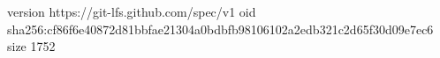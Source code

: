 version https://git-lfs.github.com/spec/v1
oid sha256:cf86f6e40872d81bbfae21304a0bdbfb98106102a2edb321c2d65f30d09e7ec6
size 1752
